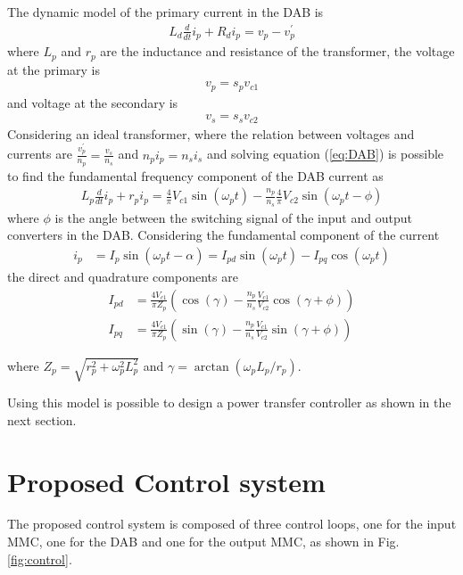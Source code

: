 \documentclass[conference]{IEEEtran}
\begin{document}
The dynamic model of the primary current in the DAB is
\begin{align}\label{eq:DAB}
L_{d}\frac{d}{dt}i_{p}+R_d i_{p}=v_{p}-v_{p}^{'}
\end{align}
where $L_p$ and $r_p$ are the inductance and resistance of the transformer, the voltage at the primary is 
\begin{align}
v_{p}=s_{p}v_{c1}
\end{align}
and voltage at the secondary is
\begin{align}
v_{s}=s_{s}v_{c2}
\end{align}
Considering an ideal transformer, where the relation between voltages and currents are $\frac{v_{p}^{'}}{n_p}=\frac{v_{s}}{n_s}$ and $n_pi_p=n_si_s$ and solving  equation (\ref{eq:DAB}) is possible to find the fundamental frequency component of the DAB current as
\begin{align}
L_{p}\frac{d}{dt}i_{p}\!+\!r_p i_{p}\!=\!\frac{4}{\pi}V_{c1}\sin(\omega_p t)\!-\!\frac{n_p}{n_s}\frac{4}{\pi}V_{c2}\sin(\omega_p t\!-\!\phi)
\end{align}
where $\phi$ is the angle between the switching signal of the input and output converters in the DAB. Considering the fundamental component of the current
\begin{align}
i_p&=I_{p}\sin(\omega_p t-\alpha)=I_{pd}\sin(\omega_p t)-I_{pq}\cos(\omega_p t)
\end{align}
the direct and quadrature components are
\begin{align}
I_{pd}&=\frac{4V_{c1}}{\pi Z_p}\left(\cos(\gamma)-\frac{n_p}{n_s}\frac{V_{c1}}{V_{c2}}\cos(\gamma+\phi)\right)\\
I_{pq}&=\frac{4V_{c1}}{\pi Z_p}\left(\sin(\gamma)-\frac{n_p}{n_s}\frac{V_{c1}}{V_{c2}}\sin(\gamma+\phi)\right)
\end{align}

where $Z_p=\sqrt{r_p^2+\omega_p^2L_p^2}$ and $\gamma=\arctan(\omega_pL_p/r_p)$. 

Using this model is possible to design a power transfer controller as shown in the next section.



\section{Proposed Control system}
The proposed control system is composed of three control loops, one for the input MMC, one for the DAB and one for the output MMC, as shown in Fig. \ref{fig:control}.
\end{document}
